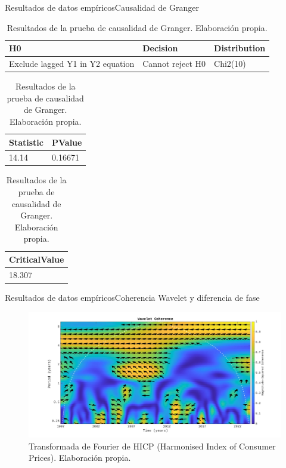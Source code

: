 \documentclass[11pt]{beamer}
\begin{document}
    \begin{frame}{Resultados de datos empíricos}{Causalidad de Granger}
	\begin{table}[h]
	    \centering
	    \begin{tabular}{|l|l|l|}
		\hline
		H0 & Decision & Distribution \\ \hline
		Exclude lagged Y1 in Y2 equation & Cannot reject H0 & Chi2(10) \\ \hline
	    \end{tabular}

	    \begin{tabular}{|l|l|}
		\hline
		Statistic & PValue \\ \hline
		14.14 & 0.16671 \\ \hline
	    \end{tabular}

	    \begin{tabular}{|l|}
		\hline
		CriticalValue \\ \hline
		18.307 \\ \hline
	    \end{tabular}
	    \caption{\tiny Resultados de la prueba de causalidad de Granger. Elaboración propia.}
	    \label{tab:granger}
	\end{table}

    \end{frame}

    \begin{frame}{Resultados de datos empíricos}{Coherencia Wavelet y diferencia de fase}
	    \begin{figure}[H]
		\centering
		\includegraphics[scale=0.175]{coherenciaFase.jpg}
		\caption{\tiny Transformada de Fourier de HICP (Harmonised Index of Consumer Prices). Elaboración propia.}
		\label{fig:inf}
	    \end{figure}
    \end{frame}
\end{document}
